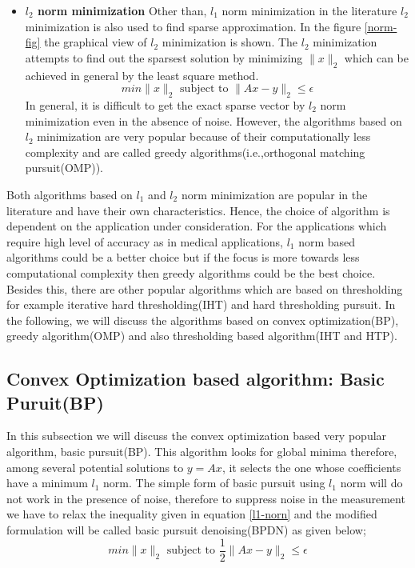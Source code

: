 \begin{itemize}
\begin{figure}
     { a) $L_2$ norm minimization}\hfil \hfil{ b) $L_1$ norm minimization}
 \end{figure}
    In the above figure \ref{norm-fig} graphical representation of $l_1$ norm minimization is shown. The objective of $l_1$ minimization is to find a sparse vector x in terms of minimum  of $\|x\|_1$ .The $l_1$ minimization is a convex program and can be solved using advanced optimization techniques like basic pusuit(BP),  least absolute shrinkage and selection operator(LASSO).
    \item \textbf{$l_2$ norm minimization}
    Other than, $l_1$ norm minimization in the literature $l_2 $ minimization is also used to find sparse approximation.
    In the figure \ref{norm-fig} the graphical view of $l_2$ minimization is shown. The $l_2$ minimization attempts to find out the sparsest solution  by minimizing  $\| x\|_2$  which can be achieved in general by the least square method.
    \begin{equation}
        min\|x\|_2 \textrm{  subject to } \|Ax -y\|_2 \le \epsilon
    \end{equation}
    In general, it is difficult to get the exact sparse vector by $l_2$ norm minimization even in the absence of noise. However, the  algorithms based on $l_2$ minimization are very popular because of their computationally less complexity and are called greedy algorithms(i.e.,orthogonal matching pursuit(OMP)).
\end{itemize}
Both algorithms based on $l_1$ and $l_2$ norm minimization are popular in the literature and have their own characteristics.  Hence, the choice of algorithm is dependent on the application under consideration. For the applications which require high level of accuracy as in medical applications, $l_1$ norm based algorithms could be a better choice but if the focus is more towards less computational complexity then greedy algorithms could be the best choice. Besides this, there are other popular algorithms which are based on thresholding for example iterative hard thresholding(IHT) and hard thresholding pursuit. In the following, we will discuss the algorithms based on convex optimization(BP), greedy algorithm(OMP) and also thresholding based algorithm(IHT and HTP).
\subsection{Convex Optimization based algorithm: Basic Puruit(BP)}
In this subsection we will discuss the convex optimization based very popular algorithm, basic pursuit(BP). This algorithm looks for global minima therefore, among several potential solutions to $y=Ax$,  it selects the one whose coefficients have a minimum  $l_1$ norm\cite{Donoho06}.
The simple form of basic pursuit using $l_1$ norm will do not work in  the presence of noise, therefore to suppress noise in the measurement we have to relax the inequality given in equation \ref{l1-norn} and the modified formulation will be called basic pursuit denoising(BPDN) as given below;
\begin{equation}
     min\|x\|_2 \textrm{  subject to } \frac{1}{2}\|Ax -y\|_2 \le \epsilon
\end{equation}

